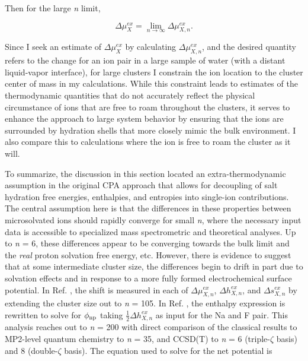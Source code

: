 \begin{cpa}
  Then for the large \emph{n} limit, 

  \begin{equation}
    \Delta \mu^{ex}_{X} = \lim_{n \rightarrow \infty} \Delta \mu^{ex}_{X,n}.
  \end{equation}

  Since I seek an estimate of $\Delta \mu^{ex}_{X}$ by calculating  $\Delta \mu^{ex}_{X,n}$, and the desired quantity refers to the change for an ion pair 
  in a large sample of water (with a distant liquid-vapor interface), for large clusters I constrain the ion location to the cluster center of mass in my 
  calculations. While this constraint leads to estimates of the thermodynamic quantities that do not accurately reflect the physical circumstance of ions 
  that are free to roam throughout the clusters, it serves to enhance the approach to large system behavior by ensuring that the ions are surrounded by 
  hydration shells that more closely mimic the bulk environment. I also compare this to calculations where the ion is free to roam the cluster as it will.

  To summarize, the discussion in this section located an extra-thermodynamic assumption in the original CPA approach\cite{coe1998cpa1} that allows for decoupling
  of salt hydration free energies, enthalpies, and entropies into single-ion contributions. The central assumption here is that the differences in these
  properties between microsolvated ions should rapidly converge for small \emph{n}, where the necessary input data is accessible to specialized mass spectrometric
  and theoretical analyses. Up to \emph{n} = 6, these differences appear to be converging towards the bulk limit and the \emph{real} proton solvation free energy, 
  etc. However, there is evidence to suggest that at some intermediate cluster size, the differences begin to drift in part due to solvation effects and in
  response to a more fully formed electrochemical surface potential. In Ref. \cite{pollard2014cpa1}, the shift is measured in each of $\Delta \mu^{ex}_{X,n}$,
  $\Delta h^{ex}_{X,n}$, and $\Delta s^{ex}_{X,n}$ by extending the cluster size out to \emph{n} = 105. In Ref. \cite{pollard2014cpa2}, the enthalpy expression
  is rewritten to solve for $\phi_{\mathrm{np}}$ taking $\frac{1}{2}\Delta h^{ex}_{X,n}$ as input for the Na\sur{+} and F\sur{-} pair. This analysis reaches out to
  \emph{n} = 200 with direct comparison of the classical results to MP2-level quantum chemistry to \emph{n} = 35, and CCSD(T) to \emph{n} = 6 (triple-$\zeta$ basis)
  and 8 (double-$\zeta$ basis). The equation used to solve for the net potential is


\end{cpa}
